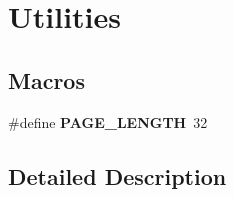 \hypertarget{group___utilities}{}\section{Utilities}
\label{group___utilities}
\subsection*{Macros}
\begin{DoxyCompactItemize}
\item 
\mbox{\label{group___utilities_gaa583f25d8bd438def94d50dff97b468d}} 
\#define {\bfseries P\+A\+G\+E\+\_\+\+L\+E\+N\+G\+TH}~32
\end{DoxyCompactItemize}


\subsection{Detailed Description}
